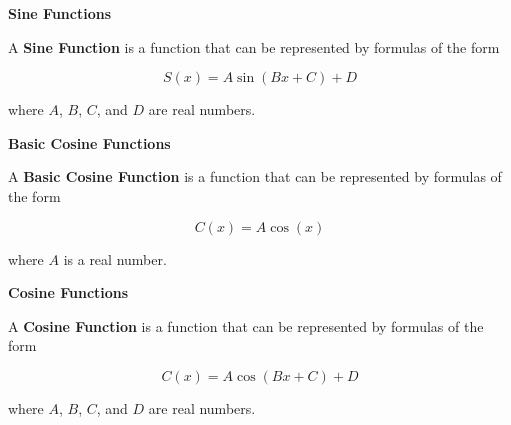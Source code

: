 \documentclass{ximera}
\begin{document}
\begin{definition} \textbf{\textcolor{green!50!black}{Sine Functions}}

A \textbf{Sine Function} is a function that can be represented by formulas of the form

\[     S(x) =    A \sin(B x + C) + D           \]

where $A$, $B$, $C$, and $D$ are real numbers.


\end{definition}
















\begin{definition} \textbf{\textcolor{green!50!black}{Basic Cosine Functions}}

A \textbf{Basic Cosine Function} is a function that can be represented by formulas of the form

\[     C(x) =    A \cos(x)           \]

where $A$ is a real number.


\end{definition}











\begin{definition} \textbf{\textcolor{green!50!black}{Cosine Functions}}

A \textbf{Cosine Function} is a function that can be represented by formulas of the form

\[     C(x) =    A \cos(B x + C) + D           \]

where $A$, $B$, $C$, and $D$ are real numbers.


\end{definition}
\end{document}
